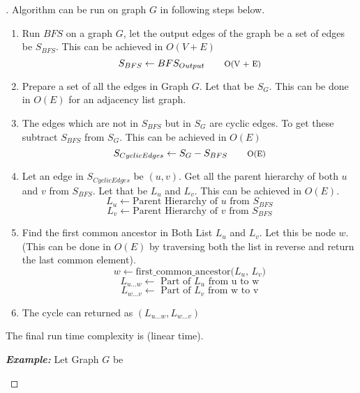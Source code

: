 \documentclass[a4paper, 12pt]{article}
\begin{document}
\begin{proof}[\color{red}{Solution}]
Algorithm can be run on graph $G$ in following steps below. 

\begin{enumerate}
    \item Run $BFS$ on a graph $G$, let the output edges of the graph be a set of edges be $S_{BFS}$. This can be achieved in $O(V + E)$
    \[ S_{BFS} \leftarrow BFS_{Output}  \tag*{\footnotesize O(V + E)} \\\]
    
    \item Prepare a set of all the edges in Graph $G$. Let that be $S_G$. This can be done in $O(E)$ for an adjacency list graph. 
    
    \item The edges which are not in $S_{BFS}$ but in $S_{G}$ are cyclic edges. To get these subtract $S_{BFS}$ from $S_G$. This can be achieved in $O(E)$
    \[ S_{Cyclic Edges} \leftarrow S_G - S_{BFS}  \tag*{\footnotesize O(E)} \\\]
    
    \item Let an edge in $S_{Cyclic Edges}$ be $(u, v)$. Get all the parent hierarchy of both $u$ and $v$ from $S_{BFS}$. Let that be $L_{u}$ and $L_{v}$. This can be achieved in $O(E)$.
    \[ L_{u} \leftarrow \text{Parent Hierarchy of $u$ from } S_{BFS}  \tag*{\footnotesize O(E)} \]
    \[ L_{v} \leftarrow \text{Parent Hierarchy of $v$ from } S_{BFS}  \tag*{\footnotesize O(E)} \]
    
    \item Find the first common ancestor in Both List $L_u$ and $L_v$. Let this be node $w$. (This can be done in $O(E)$ by traversing both the list in reverse and return the last common element).
    \[ w \leftarrow \text{first\_common\_ancestor($L_u$, $L_v$)} \tag*{\footnotesize O(E)} \]
    \[ L_{u ... w} \leftarrow \text{ Part of $L_u$ from u to w}  \]
    \[ L_{w ... v} \leftarrow \text{ Part of $L_v$ from w to v}  \tag*{\footnotesize (Reverse order)} \]
    
    \item The cycle can returned as $(L_{u ... w}, L_{w ... v})$
\end{enumerate}

The final run time complexity is  (linear time).
\bigskip

\textbf{\textit{Example: }}Let Graph $G$ be
\bigskip
\begin{center}
\begin{tikzpicture}  
  [scale=1.7,auto=center,every node/.style={circle,fill=blue!20}] %
    

\end{tikzpicture}
\end{center}
\end{proof}
\end{document}
